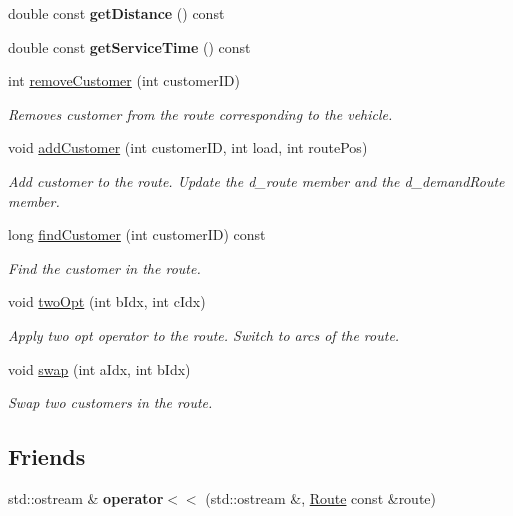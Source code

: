 \begin{DoxyCompactItemize}
double const {\bfseries get\+Distance} () const
\item 
\mbox{\label{class_route_ae30f973f4cb746802cf54d9f1827445f}} 
double const {\bfseries get\+Service\+Time} () const
\item 
int \hyperlink{class_route_a3e52680923dc08fe57d7a622cf8ad17b}{remove\+Customer} (int customer\+ID)
\begin{DoxyCompactList}\small\item\em Removes customer from the route corresponding to the vehicle. \end{DoxyCompactList}\item 
void \hyperlink{class_route_a21490cdf3853d449a2608432596ff622}{add\+Customer} (int customer\+ID, int load, int route\+Pos)
\begin{DoxyCompactList}\small\item\em Add customer to the route. Update the d\+\_\+route member and the d\+\_\+demand\+Route member. \end{DoxyCompactList}\item 
long \hyperlink{class_route_ae8402085cd8be017e3ac15fd8b3a05fd}{find\+Customer} (int customer\+ID) const
\begin{DoxyCompactList}\small\item\em Find the customer in the route. \end{DoxyCompactList}\item 
void \hyperlink{class_route_a7e21fdad3d0539f54a1cefa7b046ab49}{two\+Opt} (int b\+Idx, int c\+Idx)
\begin{DoxyCompactList}\small\item\em Apply two opt operator to the route. Switch to arcs of the route. \end{DoxyCompactList}\item 
void \hyperlink{class_route_a463c649701eb3ed5c659f5e920460335}{swap} (int a\+Idx, int b\+Idx)
\begin{DoxyCompactList}\small\item\em Swap two customers in the route. \end{DoxyCompactList}\end{DoxyCompactItemize}
\subsection*{Friends}
\begin{DoxyCompactItemize}
\item 
\mbox{\label{class_route_a7a3934c69f6ee79cb2cd22502a7f4868}} 
std\+::ostream \& {\bfseries operator$<$$<$} (std\+::ostream \&, \hyperlink{class_route}{Route} const \&route)
\end{DoxyCompactItemize}


